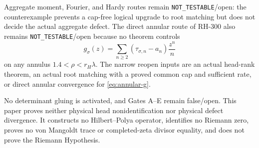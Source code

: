 \documentclass[11pt]{article}
\theoremstyle{remark}
\begin{document}
Aggregate moment, Fourier, and Hardy routes remain
\texttt{NOT\_TESTABLE}/open: the counterexample prevents a cap-free logical
upgrade to root matching but does not decide the actual aggregate defect.
The direct annular route of RH-300 \citep{WangAnnularCriteria2026} also
remains \texttt{NOT\_TESTABLE}/open because no theorem controls
\begin{equation}\label{eq:annular-g}
 g_\sigma(z)=\sum_{n\ge2}
 (\tau_{\sigma,n}-a_n)\frac{z^n}{n}
\end{equation}
on any annulus $1.4<\rho<r_H\lambda$.  The narrow reopen inputs are an actual
head-rank theorem, an actual root matching with a proved common cap and
sufficient rate, or direct annular convergence for \eqref{eq:annular-g}.

No determinant gluing is activated, and Gates A--E remain false/open.  This
paper proves neither physical head nonidentification nor physical defect
divergence.  It constructs no Hilbert--Polya operator, identifies no Riemann
zero, proves no von Mangoldt trace or completed-zeta divisor equality, and
does not prove the Riemann Hypothesis.



\end{document}
